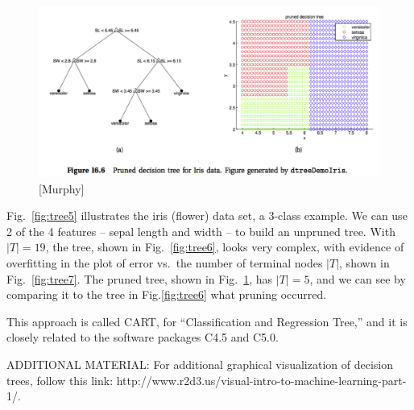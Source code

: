 \documentclass[a4paper]{article}
\begin{document}
\begin{figure}
\centering
\includegraphics[width=1.0\textwidth]{fig16_6.png}
\caption{\label{fig:tree8}[Murphy]}
\end{figure}

Fig.~\ref{fig:tree5} illustrates the iris (flower) data set, a 3-class example.  We can use 2 of the 4 features -- sepal length and width -- to build an unpruned tree.  With $|T|=19$, the tree, shown in Fig.~\ref{fig:tree6}, looks very complex, with evidence of overfitting in the plot of error vs.~the number of terminal nodes $|T|$, shown in Fig.~\ref{fig:tree7}.
The pruned tree, shown in Fig.~\ref{fig:tree8}, has $\left\vert T \right\vert = 5$, and we can see by comparing it to the tree in Fig.\ref{fig:tree6} what pruning occurred.

This approach is called CART, for ``Classification and Regression Tree,'' and it is closely related to the software packages C4.5 and C5.0.

ADDITIONAL MATERIAL: For additional graphical visualization of decision trees, follow this link: http://www.r2d3.us/visual-intro-to-machine-learning-part-1/.
\end{document}
